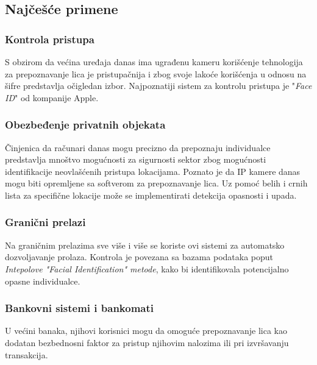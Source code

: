 \documentclass[11pt, a4paper]{article}
\begin{document}
\newpage

\subsection{Najčešće primene}
\subsubsection{Kontrola pristupa}
S obzirom da većina uređaja danas ima ugrađenu kameru korišćenje tehnologija za prepoznavanje lica je pristupačnija i zbog svoje lakoće korišćenja  u odnosu na šifre predstavlja očigledan izbor. Najpoznatiji sistem za kontrolu pristupa je "\textit{Face ID}" od kompanije Apple.  
\subsubsection{Obezbeđenje privatnih objekata}
Činjenica da računari danas mogu precizno da prepoznaju individualce predstavlja mnoštvo mogućnosti za sigurnosti sektor zbog mogućnosti identifikacije neovlašćenih pristupa lokacijama. Poznato je da IP kamere danas mogu biti opremljene sa softverom za prepoznavanje lica. Uz pomoć belih i crnih lista za specifične lokacije može se implementirati detekcija opasnosti i upada.
\subsubsection{Granični prelazi}
Na graničnim prelazima sve više i više se koriste ovi sistemi za automatsko dozvoljavanje prolaza. Kontrola je povezana sa bazama podataka poput \textit{Intepolove "Facial Identification"  metode}, kako bi identifikovala potencijalno opasne individualce.
\subsubsection{Bankovni sistemi i bankomati}
U većini banaka, njihovi korisnici mogu da omoguće prepoznavanje lica kao dodatan bezbednosni faktor za pristup njihovim nalozima ili pri izvršavanju transakcija.
\end{document}

